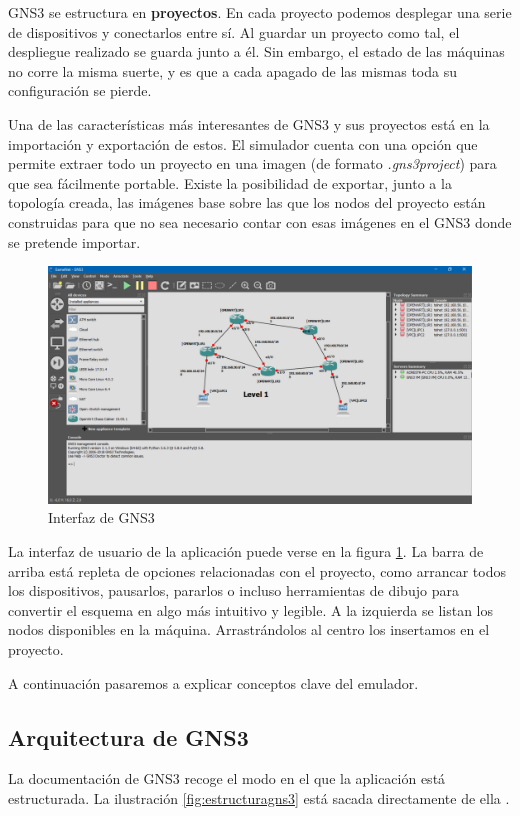 GNS3 se estructura en \textbf{proyectos}. En cada proyecto podemos desplegar una serie de dispositivos y conectarlos entre sí. Al guardar un proyecto como tal, el despliegue realizado se guarda junto a él. Sin embargo, el estado de las máquinas no corre la misma suerte, y es que a cada apagado de las mismas toda su configuración se pierde.

Una de las características más interesantes de GNS3 y sus proyectos está en la importación y exportación de estos. El simulador cuenta con una opción que permite extraer todo un proyecto en una imagen (de formato \textit{.gns3project}) para que sea fácilmente portable. Existe la posibilidad de exportar, junto a la topología creada, las imágenes base sobre las que los nodos del proyecto están construidas para que no sea necesario contar con esas imágenes en el GNS3 donde se pretende importar.

\begin{figure}[h]
  \centering
  \includegraphics[scale=0.15]{imagenes/interfazgns}
  \caption{Interfaz de GNS3}
  \label{fig:interfazgns}
\end{figure}

La interfaz de usuario de la aplicación puede verse en la figura \ref{fig:interfazgns}. La barra de arriba está repleta de opciones relacionadas con el proyecto, como arrancar todos los dispositivos, pausarlos, pararlos o incluso herramientas de dibujo para convertir el esquema en algo más intuitivo y legible. A la izquierda se listan los nodos disponibles en la máquina. Arrastrándolos al centro los insertamos en el proyecto.

A continuación pasaremos a explicar conceptos clave del emulador.

\subsection{Arquitectura de GNS3}
La documentación de GNS3 recoge el modo en el que la aplicación está estructurada. La ilustración \ref{fig:estructuragns3} está sacada directamente de ella \cite{structuregns3}.

